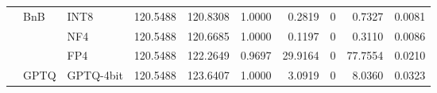\begin{table}[t]
{\begin{tabular}{ll l rrrrrrr}
 & BnB & INT8 & 120.5488 & 120.8308 & 1.0000 & 0.2819 & \cellcolor{cyan!12} $0$ & 0.7327 & 0.0081 \\
 &  & NF4 & 120.5488 & 120.6685 & 1.0000 & 0.1197 & \cellcolor{cyan!12} $0$ & 0.3110 & 0.0086 \\
 &  & FP4 & 120.5488 & 122.2649 & 0.9697 & 29.9164 & \cellcolor{cyan!12} $0$ & 77.7554 & 0.0210 \\
 & GPTQ & GPTQ-4bit & 120.5488 & 123.6407 & 1.0000 & 3.0919 & \cellcolor{cyan!12} $0$ & 8.0360 & 0.0323 \\
\bottomrule
\end{tabular}}
\end{table}